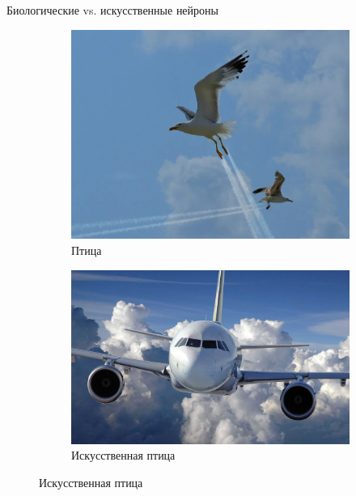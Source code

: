 \documentclass[aspectratio=169]{beamer}
\begin{document}
\begin{frame}{Биологические vs. искусственные нейроны}
    \begin{figure}
        \begin{subfigure}[b]{.4\linewidth}
            \centering
            \includegraphics[width=\linewidth]{figures/fig7.jpg}
            \caption*{Птица}
        \end{subfigure}
        \begin{subfigure}[b]{.59\linewidth}
            \centering
            \includegraphics[width=.81\linewidth]{figures/fig8.jpg}
            \caption*{Искусственная птица}
        \end{subfigure}
    \end{figure}
\end{frame}
\end{document}
